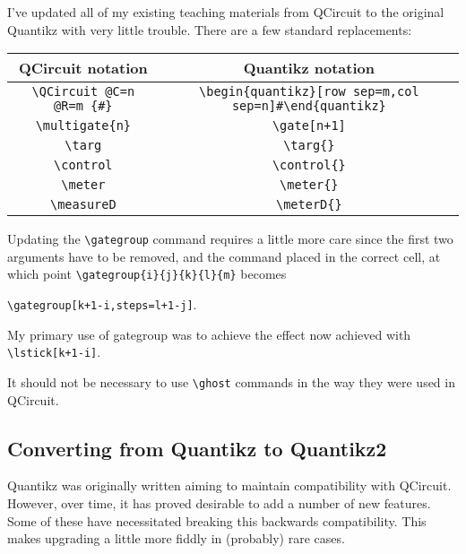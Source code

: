 \documentclass[aps,pra,10pt,nofootinbib]{revtex4-2}
\begin{document}
I've updated all of my existing teaching materials from QCircuit to the original Quantikz with very little trouble. There are a few standard replacements:
\begin{center}
  \begin{tabular}{c|c}
    QCircuit notation              & Quantikz notation                                           \\
    \hline
    \verb!\QCircuit @C=n @R=m {#}! & \verb!\begin{quantikz}[row sep=m,col sep=n]#\end{quantikz}! \\
    \verb!\multigate{n}!           & \verb!\gate[n+1]!                                           \\
    \verb!\targ!                   & \verb!\targ{}!                                              \\
    \verb!\control!                & \verb!\control{}!                                           \\
    \verb!\meter!                  & \verb!\meter{}!                                             \\
    \verb!\measureD!               & \verb!\meterD{}!                                            \\
  \end{tabular}
\end{center}
Updating the \verb!\gategroup! command requires a little more care since the first two arguments have to be removed, and the command placed in the correct cell, at which point \verb!\gategroup{i}{j}{k}{l}{m}! becomes
\begin{center}
  \verb!\gategroup[k+1-i,steps=l+1-j]!.
\end{center}
My primary use of gategroup was to achieve the effect now achieved with \verb!\lstick[k+1-i]!.

It should not be necessary to use \verb!\ghost! commands in the way they were used in QCircuit.

\subsection{Converting from Quantikz to Quantikz2}

Quantikz was originally written aiming to maintain compatibility with QCircuit. However, over time, it has proved desirable to add a number of new features. Some of these have necessitated breaking this backwards compatibility. This makes upgrading a little more fiddly in (probably) rare cases.
\end{document}
